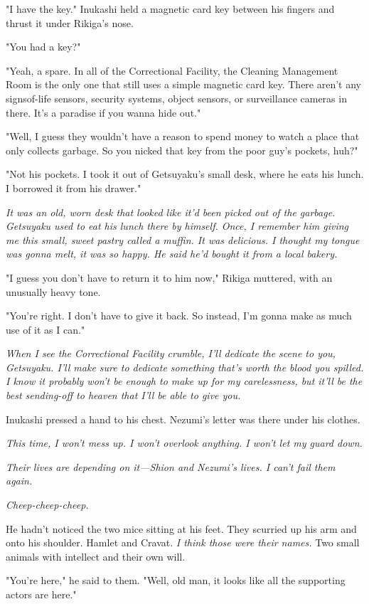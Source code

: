 "I have the key." Inukashi held a magnetic card key between his fingers
and thrust it under Rikiga's nose.

"You had a key?"

"Yeah, a spare. In all of the Correctional Facility, the Cleaning
Management Room is the only one that still uses a simple magnetic card
key. There aren't any signsof-life sensors, security systems, object
sensors, or surveillance cameras in there. It's a paradise if you wanna
hide out."

"Well, I guess they wouldn't have a reason to spend money to watch a
place that only collects garbage. So you nicked that key from the poor
guy's pockets, huh?"

"Not his pockets. I took it out of Getsuyaku's small desk, where he eats
his lunch. I borrowed it from his drawer."

\emph{It was an old, worn desk that looked like it'd been picked out of the
garbage. Getsuyaku used to eat his lunch there by himself. Once, I
remember him giving me this small, sweet pastry called a muffin. It was
delicious. I thought my tongue was gonna melt, it was so happy. He said
he'd bought it from a local bakery.}

"I guess you don't have to return it to him now," Rikiga muttered, with
an unusually heavy tone.

"You're right. I don't have to give it back. So instead, I'm gonna make
as much use of it as I can."

\emph{When I see the Correctional Facility crumble, I'll dedicate the scene to
you, Getsuyaku. I'll make sure to dedicate something that's worth the
blood you spilled. I know it probably won't be enough to make up for my
carelessness, but it'll be the best sending-off to heaven that I'll be
able to give you.}

Inukashi pressed a hand to his chest. Nezumi's letter was there under
his clothes.

\emph{This time, I won't mess up. I won't overlook anything. I won't let my
guard down.}

\emph{Their lives are depending on it---Shion and Nezumi's lives. I can't fail
them again.}

\emph{Cheep-cheep-cheep.}

He hadn't noticed the two mice sitting at his feet. They scurried up his
arm and onto his shoulder. Hamlet and Cravat. \emph{I think those were their
names.} Two small animals with intellect and their own will.

"You're here," he said to them. "Well, old man, it looks like all the
supporting actors are here."

